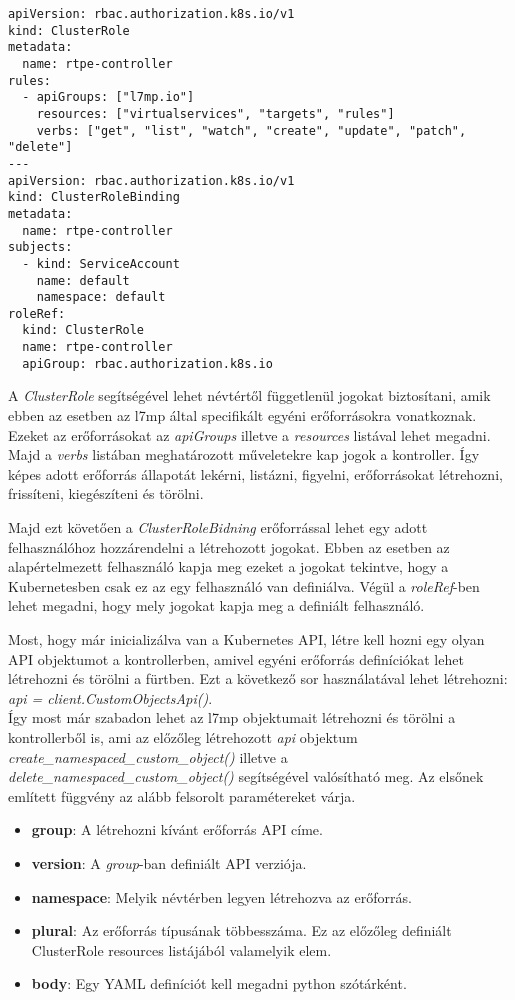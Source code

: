 \begin{lstlisting}[caption=RBAC létrehozása, label=lst:rbac]
apiVersion: rbac.authorization.k8s.io/v1
kind: ClusterRole
metadata:
  name: rtpe-controller
rules:
  - apiGroups: ["l7mp.io"]
    resources: ["virtualservices", "targets", "rules"]
    verbs: ["get", "list", "watch", "create", "update", "patch", "delete"]
---
apiVersion: rbac.authorization.k8s.io/v1
kind: ClusterRoleBinding
metadata:
  name: rtpe-controller
subjects:
  - kind: ServiceAccount
    name: default
    namespace: default
roleRef:
  kind: ClusterRole
  name: rtpe-controller
  apiGroup: rbac.authorization.k8s.io
\end{lstlisting}

A \textit{ClusterRole} segítségével lehet névtértől függetlenül jogokat biztosítani,
amik ebben az esetben az l7mp által specifikált egyéni erőforrásokra vonatkoznak. 
Ezeket az erőforrásokat az \textit{apiGroups} illetve a \textit{resources} listával
lehet megadni. Majd a \textit{verbs} listában meghatározott műveletekre kap 
jogok a kontroller. Így képes adott erőforrás állapotát lekérni, listázni, figyelni,
erőforrásokat létrehozni, frissíteni, kiegészíteni és törölni. 

Majd ezt követően a \textit{ClusterRoleBidning} erőforrással lehet egy adott
felhasználóhoz hozzárendelni a létrehozott jogokat. Ebben az esetben az alapértelmezett
felhasználó kapja meg ezeket a jogokat tekintve, hogy a Kubernetesben csak ez az egy
felhasználó van definiálva. Végül a \textit{roleRef}-ben lehet megadni, hogy mely
jogokat kapja meg a definiált felhasználó. 

Most, hogy már inicializálva van a Kubernetes API, létre kell hozni egy olyan 
API objektumot a kontrollerben, amivel egyéni erőforrás definíciókat lehet létrehozni
és törölni a fürtben. Ezt a következő sor használatával lehet létrehozni: 
\textit{api = client.CustomObjectsApi()}. \\

Így most már szabadon lehet az l7mp objektumait létrehozni és törölni a kontrollerből is, 
ami az előzőleg létrehozott \textit{api} objektum \textit{create\_namespaced\_custom\_object()}
illetve a \textit{delete\_namespaced\_custom\_object()} segítségével valósítható meg. Az elsőnek
említett függvény az alább felsorolt paramétereket várja.

\begin{itemize}
	\item \textbf{group}: A létrehozni kívánt erőforrás API címe.  
	\item \textbf{version}: A \textit{group}-ban definiált API verziója. 
	\item \textbf{namespace}: Melyik névtérben legyen létrehozva az erőforrás.
	\item \textbf{plural}: Az erőforrás típusának többesszáma. Ez az előzőleg definiált
	ClusterRole resources listájából valamelyik elem. 
	\item \textbf{body}: Egy YAML definíciót kell megadni python szótárként. 
\end{itemize}

